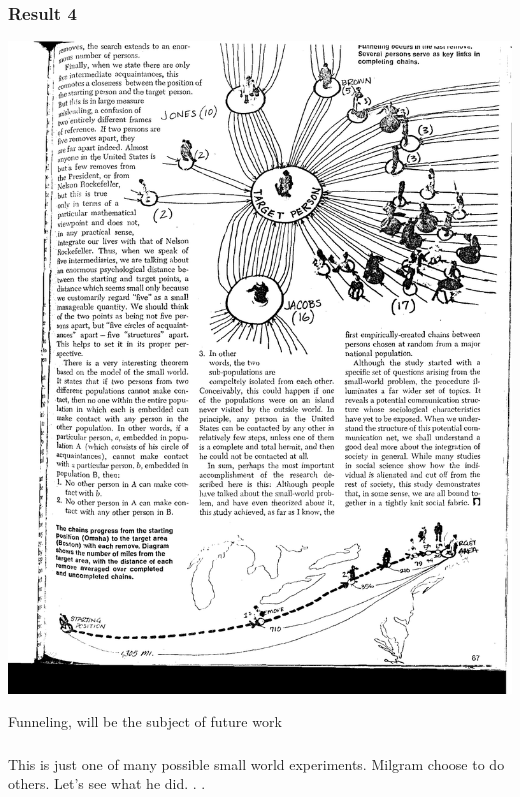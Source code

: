 \documentclass[aspectratio=169]{beamer}
\begin{document}
\begin{frame}
\frametitle{Result 4}

\begin{center}
\includegraphics[height=0.8\textheight]{figures/milgram_small-world_1967_funneling}
\end{center}

Funneling, will be the subject of future work

\end{frame}
\begin{frame}
\frametitle{}

This is just one of many possible small world experiments. Milgram choose to do others. Let's see what he did. . .

\end{frame}
\end{document}
